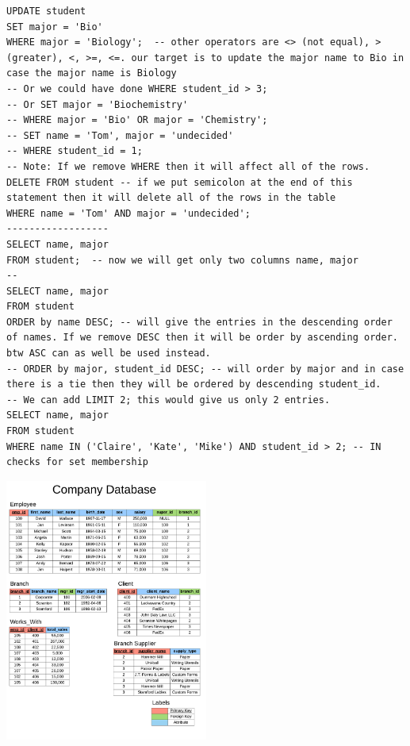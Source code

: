 \documentclass[8pt, a4paper, oneside, twocolumn]{extarticle}
\begin{document}
\begin{verbatim}
UPDATE student
SET major = 'Bio'
WHERE major = 'Biology';  -- other operators are <> (not equal), > (greater), <, >=, <=. our target is to update the major name to Bio in case the major name is Biology
-- Or we could have done WHERE student_id > 3;
-- Or SET major = 'Biochemistry'
-- WHERE major = 'Bio' OR major = 'Chemistry';
-- SET name = 'Tom', major = 'undecided'
-- WHERE student_id = 1;
-- Note: If we remove WHERE then it will affect all of the rows.
DELETE FROM student -- if we put semicolon at the end of this statement then it will delete all of the rows in the table
WHERE name = 'Tom' AND major = 'undecided';
------------------
SELECT name, major
FROM student;  -- now we will get only two columns name, major
--
SELECT name, major
FROM student
ORDER by name DESC; -- will give the entries in the descending order of names. If we remove DESC then it will be order by ascending order. btw ASC can as well be used instead.
-- ORDER by major, student_id DESC; -- will order by major and in case there is a tie then they will be ordered by descending student_id.
-- We can add LIMIT 2; this would give us only 2 entries.
SELECT name, major
FROM student
WHERE name IN ('Claire', 'Kate', 'Mike') AND student_id > 2; -- IN checks for set membership
\end{verbatim}
\includegraphics[width=0.5\textwidth,height=0.5\textheight,keepaspectratio]{company-database}
\end{document}
